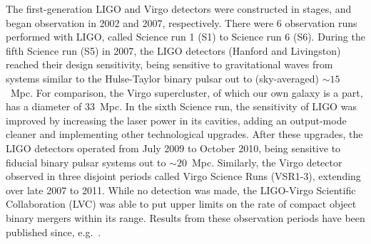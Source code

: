 The first-generation LIGO and Virgo detectors were constructed in stages, and
began observation in 2002 and 2007, respectively. There were 6 observation 
runs performed with LIGO, called Science run 1 (S1) to Science run 6 (S6). 
During the fifth Science run (S5) in 2007, the LIGO detectors (Hanford and
Livingston) reached their design sensitivity, being sensitive to gravitational 
waves from systems similar to the Hulse-Taylor binary pulsar out to 
(sky-averaged) $\sim 15$~Mpc.
For comparison, the Virgo supercluster, of which our own galaxy is a part, has
a diameter of $33$~Mpc. In the sixth Science run, the sensitivity of LIGO 
was improved by increasing the laser power in its cavities, adding 
an output-mode cleaner and implementing other technological upgrades. 
After these upgrades, the LIGO detectors operated from July 2009
to October 2010, being sensitive to fiducial binary pulsar systems out to 
$\sim 20$~Mpc. 
Similarly, the Virgo detector observed in three disjoint periods called Virgo 
Science Runs (VSR1-3), extending over late 2007 to 2011.
While no detection was made, the LIGO-Virgo Scientific Collaboration
(LVC) was able to put upper limits on the rate of compact object binary mergers
within its range. Results from these observation periods have been published 
since, e.g.~\cite{Messaritaki:2005wv,Abadie:2010mt,Abadie:2012rq,Abbott:2009km,
Colaboration:2011nz,Abadie:2010yb,Abbott:2009qj,Abbott:2009tt,Abadie:2011kd,
Aasi:2012rja,Abbott:2003yq,Abbott:2005pu,Sintes:2005fp,Abadie:2011md,
Palomba:2012wn}. 

